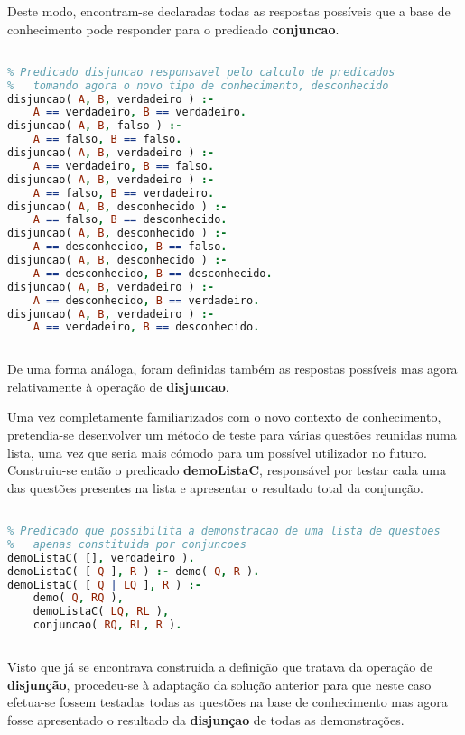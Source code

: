 \documentclass[a4paper]{article}
\begin{document}
Deste modo, encontram-se declaradas todas as respostas possíveis que a base de conhecimento pode responder para o predicado \textbf{conjuncao}.

\begin{lstlisting}[language=Prolog, caption=Predicado \textbf{conjuncao}.]

% Predicado disjuncao responsavel pelo calculo de predicados
% 	tomando agora o novo tipo de conhecimento, desconhecido
disjuncao( A, B, verdadeiro ) :-
	A == verdadeiro, B == verdadeiro.
disjuncao( A, B, falso ) :-
	A == falso, B == falso.
disjuncao( A, B, verdadeiro ) :-
	A == verdadeiro, B == falso.
disjuncao( A, B, verdadeiro ) :-
	A == falso, B == verdadeiro.
disjuncao( A, B, desconhecido ) :-
	A == falso, B == desconhecido.
disjuncao( A, B, desconhecido ) :-
	A == desconhecido, B == falso.
disjuncao( A, B, desconhecido ) :-
	A == desconhecido, B == desconhecido.
disjuncao( A, B, verdadeiro ) :-
	A == desconhecido, B == verdadeiro.
disjuncao( A, B, verdadeiro ) :-
	A == verdadeiro, B == desconhecido.
	
\end{lstlisting}

De uma forma análoga, foram definidas também as respostas possíveis mas agora relativamente à operação de \textbf{disjuncao}.

Uma vez completamente familiarizados com o novo contexto de conhecimento, pretendia-se desenvolver um método de teste para várias questões reunidas numa lista, uma vez que seria mais cómodo para um possível utilizador no futuro. Construiu-se então o predicado \textbf{demoListaC}, responsável por testar cada uma das questões presentes na lista e apresentar o resultado total da conjunção.

\begin{lstlisting}[language=Prolog, caption=Predicado \textbf{DemoListaC}.]

% Predicado que possibilita a demonstracao de uma lista de questoes
% 	apenas constituida por conjuncoes
demoListaC( [], verdadeiro ).
demoListaC( [ Q ], R ) :- demo( Q, R ).
demoListaC( [ Q | LQ ], R ) :-
	demo( Q, RQ ),
	demoListaC( LQ, RL ),
	conjuncao( RQ, RL, R ).
	
\end{lstlisting}

Visto que já se encontrava construida a definição que tratava da operação de \textbf{disjunção}, procedeu-se à adaptação da solução anterior para que neste caso efetua-se fossem testadas todas as questões na base de conhecimento mas agora fosse apresentado o resultado da \textbf{disjunçao} de todas as demonstrações.
\end{document}

